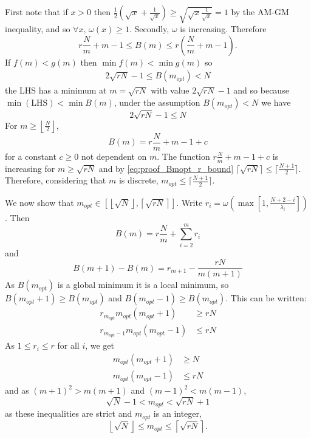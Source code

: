 First note that if $x > 0$ then $ \frac{1}{2}\left(\sqrt{x} + \frac{1}{\sqrt{x}}\right) \geq \sqrt{\sqrt{x}\frac{1}{\sqrt{x}}} = 1$ by the AM-GM inequality, and so $\forall x, \, \omega(x) \geq 1$. Secondly, $\omega$ is increasing. Therefore
\begin{equation}
    r\frac{N}{m} + m - 1 \leq B(m) \leq r\left(\frac{N}{m} + m - 1\right).
\end{equation}
If $f(m) < g(m)$ then $\min f(m) < \min g(m)$ so
\begin{align}
    2\sqrt{rN} - 1 \leq B(m_{opt}) < N
\end{align}
the LHS has a minimum at $m=\sqrt{rN}$ with value $2\sqrt{rN} - 1$ and so because $\min(\text{LHS}) < \min B(m)$, under the assumption $B(m_{opt}) < N$ we have
\begin{equation}
    2\sqrt{rN} -1 \leq N \label{eq:proof_Bmopt_r_bound}
\end{equation}
For $m \geq \left\lfloor \frac{N}{2}\right\rfloor$,
\begin{equation}
    B(m) = r\frac{N}{m} + m - 1 + c
\end{equation}
for a constant $c \geq 0$ not dependent on $m$. The function $r\frac{N}{m} + m - 1 + c$ is increasing for $m \geq \sqrt{rN}$ and by \ref{eq:proof_Bmopt_r_bound} $\lceil\sqrt{rN}\rceil \leq \lceil\frac{N+1}{2}\rceil$. Therefore, considering that $m$ is discrete, $m_{opt} \leq \lceil\frac{N+1}{2}\rceil$.

We now show that $m_{opt} \in \left[ \left\lfloor \sqrt{N} \right\rfloor, \left\lceil \sqrt{rN} \right\rceil \right]$. Write $r_{i} = \omega\left(\max\left[1,\frac{N+2-i}{\lambda_{i}}\right]\right)$. Then 
\begin{equation}
    B(m) = r\frac{N}{m} + \sum_{i=2}^{m} r_{i}
\end{equation}
and
\begin{equation}
    B(m+1) - B(m) = r_{m+1} - \frac{rN}{m(m+1)}
\end{equation}
As $B(m_{opt})$ is a global minimum it is a local minimum, so
$B(m_{opt} + 1) \geq B(m_{opt})$ and $B(m_{opt} - 1) \geq B(m_{opt})$. This can be written:
\begin{align}
     r_{m_{opt}} m_{opt}(m_{opt} + 1)&\geq rN \\
    r_{m_{opt}-1}m_{opt}(m_{opt} - 1) &\leq rN
\end{align}
As $1 \leq r_{i} \leq r$ for all $i$, we get
\begin{align}
    m_{opt}(m_{opt} + 1)&\geq N  \\
    m_{opt}(m_{opt} - 1) &\leq rN 
\end{align}
and as $(m+1)^{2} > m(m+1)$ and $(m-1)^{2} < m(m-1)$,
\begin{equation}
    \sqrt{N} - 1 < m_{opt} < \sqrt{rN} + 1
\end{equation}
as these inequalities are strict and $m_{opt}$ is an integer,
\begin{equation}
\left\lfloor\sqrt{N}\right\rfloor \leq m_{opt} \leq \left\lceil\sqrt{rN}\right\rceil.
\end{equation}
\iffalse
